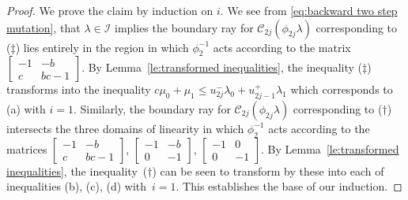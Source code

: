 \documentclass[pdflatex,sn-mathphys]{sn-jnl}%
\theoremstyle{thmstyleone}%
\theoremstyle{thmstyletwo}%
\theoremstyle{thmstylethree}%
\newcommand{\cC}{\mathcal{C}}
\newcommand{\cI}{\mathcal{I}}
\begin{document}
\begin{proof}
    We prove the claim by induction on $i$.
    We see from \eqref{eq:backward two step mutation}, that $\lambda\in\cI$ implies the boundary ray for $\cC_{2j}(\phi_{2j}\lambda)$ corresponding to ($\ddagger$) lies entirely in the region in which $\phi_2^{-1}$ acts according to the matrix $\left[ \begin{array}{cc} -1 & -b\\ c & bc-1 \end{array}\right]$.
    By Lemma~\ref{le:transformed inequalities}, the inequality ($\ddagger$) transforms into the inequality $c\mu_0+\mu_1\le u_{2j}^-\lambda_0+u_{2j-1}^+\lambda_1$ which corresponds to (a) with $i=1$.
    Similarly, the boundary ray for $\cC_{2j}(\phi_{2j}\lambda)$ corresponding to ($\dagger$) intersects the three domains of linearity in which $\phi_2^{-1}$ acts according to the matrices $\left[ \begin{array}{cc} -1 & -b\\ c & bc-1 \end{array}\right]$, $\left[ \begin{array}{cc} -1 & -b\\ 0 & -1 \end{array}\right]$, $\left[ \begin{array}{cc} -1 & 0\\ 0 & -1 \end{array}\right]$.
    By Lemma~\ref{le:transformed inequalities}, the inequality~($\dagger$) can be seen to transform by these into each of inequalities (b), (c), (d) with~$i=1$.
    This establishes the base of our induction.


\end{proof}
\end{document}
